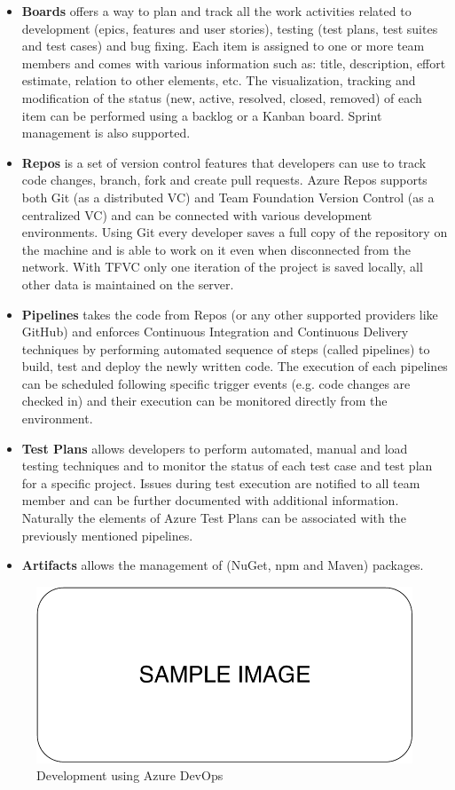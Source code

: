 \begin{itemize}
    \item \textbf{Boards} offers a way to plan and track all the work activities related to development (epics, features and user stories), testing (test plans, test suites and test cases) and bug fixing. Each item is assigned to one or more team members and comes with various information such as: title, description, effort estimate, relation to other elements, etc. The visualization, tracking and modification of the status (new, active, resolved, closed, removed) of each item can be performed using a backlog or a Kanban board. Sprint management is also supported.
    \item \textbf{Repos} is a set of version control features that developers can use to track code changes, branch, fork and create pull requests. Azure Repos supports both Git (as a distributed VC) and Team Foundation Version Control (as a centralized VC) and can be connected with various development environments. Using Git every developer saves a full copy of the repository on the machine and is able to work on it even when disconnected from the network. With TFVC only one iteration of the project is saved locally, all other data is maintained on the server.
    \item \textbf{Pipelines} takes the code from Repos (or any other supported providers like GitHub) and enforces Continuous Integration and Continuous Delivery techniques by performing automated sequence of steps (called pipelines) to build, test and deploy the newly written code. The execution of each pipelines can be scheduled following specific trigger events (e.g. code changes are checked in) and their execution can be monitored directly from the environment.
    \item \textbf{Test Plans} allows developers to perform automated, manual and load testing techniques and to monitor the status of each test case and test plan for a specific project. Issues during test execution are notified to all team member and can be further documented with additional information. Naturally the elements of Azure Test Plans can be associated with the previously mentioned pipelines.
    \item \textbf{Artifacts} allows the management of (NuGet, npm and Maven) packages.
\end{itemize}

\begin{figure}[ht]
	\centering
	\includegraphics[scale=0.7]{Images/SampleImage.pdf}
	\caption{Development using Azure DevOps}
	\label{fig:devOpsDevelopment}
\end{figure}

